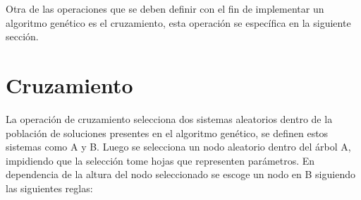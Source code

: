 \begin{center}
\begin{adjustbox}{width=0.5\textwidth, keepaspectratio}
    \end{adjustbox}
\end{center}

Otra de las operaciones que se deben definir con el fin de implementar un algoritmo genético es el cruzamiento, esta operación se específica en la siguiente sección.

\section{Cruzamiento}\label{section:xcross}

La operación de cruzamiento selecciona dos sistemas aleatorios dentro de la población de soluciones presentes en el algoritmo genético, se definen estos sistemas como A y B. Luego se selecciona un nodo aleatorio dentro del árbol A, impidiendo que la selección tome hojas que representen parámetros. En dependencia de la altura del nodo seleccionado se escoge un nodo en B siguiendo las siguientes reglas:

